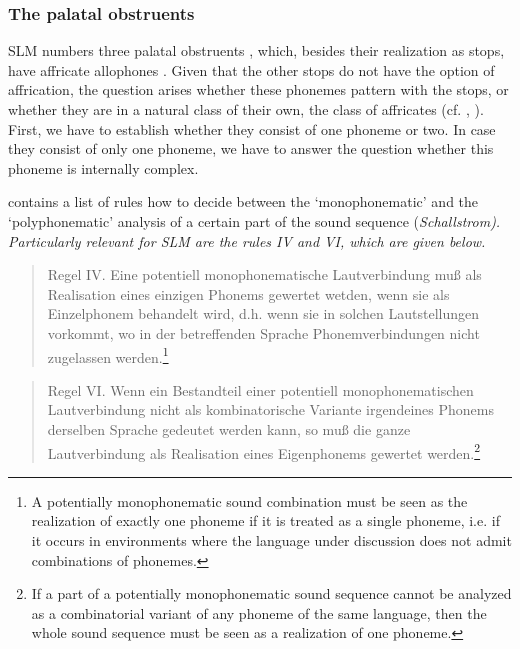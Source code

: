 \subsubsection{The palatal obstruents}\label{sec:phon:Thepalatalobstruents}  
SLM numbers three palatal obstruents , which, besides their realization as stops, have affricate allophones \phonet{\textcttctclig,\textctdctzlig,\super{\ny}\textctdctzlig}. Given that the other stops do not have the option of affrication, the question arises whether these phonemes pattern with the stops, or whether they are in a natural class of their own, the class of affricates (cf. \citet[63]{Bichsel}, \citet[357]{Noonan2006}). First, we have to establish whether they consist of one phoneme or two. In case they consist of only one phoneme, we have to answer the question whether this phoneme is internally complex.

\citet{Trubetzkoy1939} contains a list of rules how to decide between the `monophonematic' and the `polyphonematic' analysis of a certain part of the sound sequence (\em Schallstrom\em). Particularly relevant for SLM are the rules IV and VI, which are given below.

\begin{quote}
Regel IV. Eine potentiell monophonematische \el{} Lautverbindung muß als Realisation eines einzigen Phonems gewertet wetden, wenn sie als Einzelphonem behandelt wird, d.h. wenn sie in solchen Lautstellungen vorkommt, wo in der betreffenden Sprache Phonemverbindungen nicht zugelassen werden.\footnote{A potentially monophonematic sound combination must be seen as the realization of exactly one phoneme if it is treated as a single phoneme, i.e. if it occurs in environments where the language under discussion does not admit combinations of phonemes.}
 \citep[53]{Trubetzkoy1939}
\end{quote}

\begin{quote}
Regel VI. Wenn ein Bestandteil einer potentiell monophonematischen Lautverbindung nicht als kombinatorische Variante irgendeines Phonems derselben Sprache gedeutet werden kann, so muß die ganze Lautverbindung als Realisation eines Eigenphonems gewertet werden.\footnote{If a part of a potentially monophonematic sound sequence cannot be analyzed as a combinatorial variant of any phoneme of the same language, then the whole sound sequence must be seen as a realization of one phoneme.}
\citep[54]{Trubetzkoy1939}
\end{quote}

